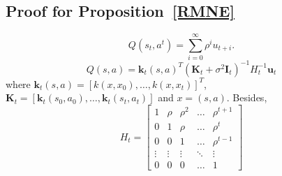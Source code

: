 \documentclass{article}
\begin{document}
%

\subsection{Proof for Proposition~\ref{RMNE}}
{\color{red}
\begin{equation}
\label{Qfun}
Q(s_t, a^t)= {\sum}_{i=0}^{\infty} \rho^{i} u_{t+i}.
\end{equation}
\begin{equation}
Q(s,a) = \bm{k}_t(s,a)^{T} (\bm{K}_t+\sigma^2 \bm{I}_t)^{-1} H_t^{-1} \bm{u}_t
\end{equation}
where $\bm{k}_t(s,a) = [k(x, x_0), \ldots, k(x, x_t)]^{T}$, $\bm{K}_t=[\bm{k}_t(s_0,a_0),\ldots,\bm{k}_t(s_t,a_t)]$ and $x=(s,a)$. Besides,
\begin{equation}
H_t = \left[
\begin{array}{ccccc}
1 & \rho & \rho^2 &\ldots & \rho^{t+1}\\
0 & 1 & \rho & \ldots & \rho^{t}\\
0 & 0 & 1 & \ldots & \rho^{t-1} \\
\vdots & \vdots & \vdots & \ddots& \vdots\\
0 & 0 & 0 & \ldots & 1
\end{array}
\right]
\end{equation}
}\\
\end{document}

